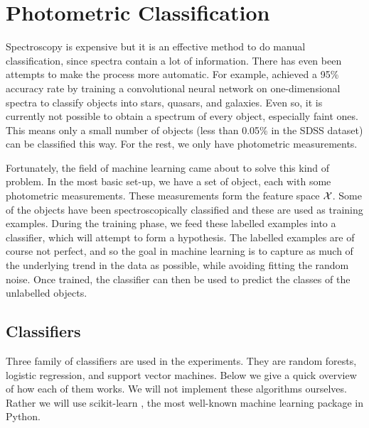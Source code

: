

\chapter{Photometric Classification}
\label{cha:ml}

Spectroscopy is expensive but it is an effective method to do manual classification,
since spectra contain a lot of information. There has even been attempts to make the process
more automatic. For example,  achieved a 95\% accuracy rate by training
a convolutional neural network on one-dimensional spectra to classify objects
into stars, quasars, and galaxies. Even so, it is currently not possible to obtain
a spectrum of every object, especially faint ones. This means only a small number of objects
(less than 0.05\% in the SDSS dataset) can be classified this way. For the rest,
we only have photometric measurements.

Fortunately, the field of machine learning came about to solve this kind of problem.
In the most basic set-up, we have a set of object, each with some photometric measurements.
These measurements form the feature space $\mathcal{X}$.
Some of the objects have been spectroscopically classified and these are used as training
examples. During the training phase, we feed these labelled examples into a classifier,
which will attempt to form a hypothesis. The labelled examples are of course not perfect, and so
the goal in machine learning is to capture as much of the underlying trend in the data as possible,
while avoiding fitting the random noise. Once trained, the classifier can then
be used to predict the classes of the unlabelled objects.

\section{Classifiers}
\label{sec:machine}
Three family of classifiers are used in the experiments. They are random forests,
logistic regression, and support vector machines. Below we give a quick overview of how
each of them works. We will not implement these algorithms ourselves. Rather we will use
scikit-learn \cite{pedregosa11}, the most well-known machine learning package
in Python. 

